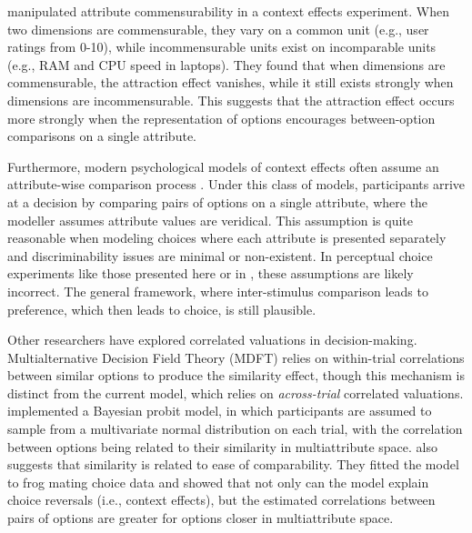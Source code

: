 \textcite{hayes2024attribute} manipulated attribute commensurability in a context effects experiment. When two dimensions are commensurable, they vary on a common unit (e.g., user ratings from 0-10), while incommensurable units exist on incomparable units (e.g., RAM and CPU speed in laptops). They found that when dimensions are commensurable, the attraction effect vanishes, while it still exists strongly when dimensions are incommensurable. This suggests that the attraction effect occurs more strongly when the representation of options encourages between-option comparisons on a single attribute.

Furthermore, modern psychological models of context effects often assume an attribute-wise comparison process \parencite{roeMultialternativeDecisionField2001a,trueblood2013not,usherLossAversionInhibition2004a,bhatiaAssociationsAccumulationPreference2013b}. Under this class of models, participants arrive at a decision by comparing pairs of options on a single attribute, where the modeller assumes attribute values are veridical. This assumption is quite reasonable when modeling choices where each attribute is presented separately and discriminability issues are minimal or non-existent. In perceptual choice experiments like those presented here or in \textcite{spektorWhenGoodLooks2018b,trueblood2013not}, these assumptions are likely incorrect. The general framework, where inter-stimulus comparison leads to preference, which then leads to choice, is still plausible.


Other researchers have explored correlated valuations in decision-making. Multialternative Decision Field Theory (MDFT) \parencite{roeMultialternativeDecisionField2001a} relies on within-trial correlations between similar options to produce the similarity effect, though this mechanism is distinct from the current model, which relies on \textit{across-trial} correlated valuations. \textcite{natenzon2019random} implemented a Bayesian probit model, in which participants are assumed to sample from a multivariate normal distribution on each trial, with the correlation between options being related to their similarity in multiattribute space. \textcite{natenzon2019random} also suggests that similarity is related to ease of comparability. They fitted the model to frog mating choice data and showed that not only can the model explain choice reversals (i.e., context effects), but the estimated correlations between pairs of options are greater for options closer in multiattribute space. 



